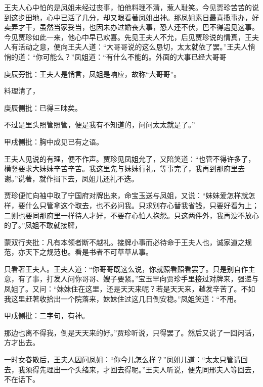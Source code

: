 \begin{parag}
    王夫人心中怕的是凤姐未经过丧事，怕他料理不清，惹人耻笑。今见贾珍苦苦的说到这步田地，心中已活了几分，却又眼看著凤姐出神。那凤姐素日最喜揽事办，好卖弄才干，虽然当家妥当，也因未办过婚丧大事，恐人还不伏，巴不得遇见这事。今见贾珍如此一来，他心中早已欢喜。先见王夫人不允，后见贾珍说的情真，王夫人有活动之意，便向王夫人道：“大哥哥说的这么恳切，太太就依了罢。”王夫人悄悄的道：“你可能么？”凤姐道：“有什么不能的。外面的大事已经大哥哥\begin{note}庚辰旁批：王夫人是悄言，凤姐是响应，故称“大哥哥”。\end{note}料理清了，\begin{note}庚辰侧批：已得三昧矣。\end{note}不过是里头照管照管，便是我有不知道的，问问太太就是了。”\begin{note}甲戌侧批：胸中成见已有之语。\end{note}王夫人见说的有理，便不作声。贾珍见凤姐允了，又陪笑道：“也管不得许多了，横竖要求大妹妹辛苦辛苦。我这里先与妹妹行礼，等事完了，我再到那府里去谢。”说著，就作揖下去，凤姐儿还礼不迭。
\end{parag}


\begin{parag}
    贾珍便忙向袖中取了宁国府对牌出来，命宝玉送与凤姐，又说：“妹妹爱怎样就怎样，要什么只管拿这个取去，也不必问我。只求别存心替我省钱，只要好看为上；二则也要同那府里一样待人才好，不要存心怕人抱怨。只这两件外，我再没不放心的了。”凤姐不敢就接牌，\begin{note}蒙双行夹批：凡有本领者断不越礼。接牌小事而必待命于王夫人也，诚家道之规范，亦天下之规范也。看是书者不可草草从事。\end{note}只看著王夫人。王夫人道：“你哥哥既这么说，你就照看照看罢了。只是别自作主意，有了事，打发人问你哥哥、嫂子要紧。”宝玉早向贾珍手里接过对牌来，强递与凤姐了。又问：“妹妹住在这里，还是天天来呢？若是天天来，越发辛苦了。不如我这里赶著收拾出一个院落来，妹妹住过这几日倒安稳。”凤姐笑道：“不用。\begin{note}甲戌侧批：二字句，有神。\end{note}那边也离不得我，倒是天天来的好。”贾珍听说，只得罢了。然后又说了一回闲话，方才出去。
\end{parag}


\begin{parag}
    一时女眷散后，王夫人因问凤姐：“你今儿怎么样？”凤姐儿道：“太太只管请回去，我须得先理出一个头绪来，才回去得呢。”王夫人听说，便先同邢夫人等回去，不在话下。
\end{parag}


